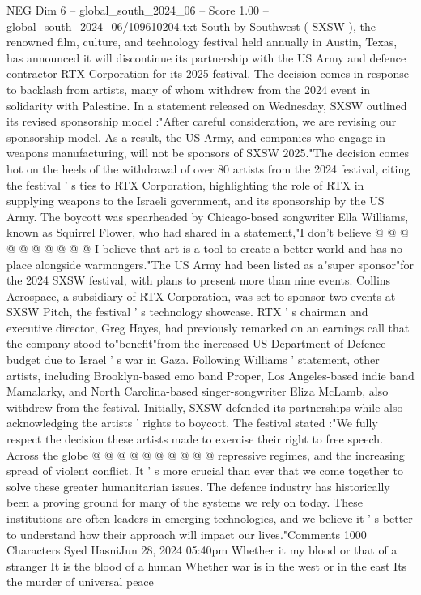 \begin{textsample}{NEG Dim 6 – global\_south\_2024\_06 – Score 1.00 – global\_south\_2024\_06/109610204.txt}  \label{ex:f6_neg_303}
South by Southwest ( SXSW ), the renowned film, culture, and technology festival held annually in Austin, Texas, has announced it will discontinue its partnership with the US Army and defence contractor RTX Corporation for its 2025 festival.
The decision comes in response to backlash from artists, many of whom withdrew from the 2024 event in solidarity with Palestine.
In a statement released on Wednesday, SXSW outlined its revised sponsorship model :"After careful consideration, we are revising our sponsorship model.
As a result, the US Army, and companies who engage in weapons manufacturing, will not be sponsors of SXSW 2025."The decision comes hot on the heels of the withdrawal of over 80 artists from the 2024 festival, citing the festival ' s ties to RTX Corporation, highlighting the role of RTX in supplying weapons to the Israeli government, and its sponsorship by the US Army.
The boycott was spearheaded by Chicago-based songwriter Ella Williams, known as Squirrel Flower, who had shared in a statement,"I don't believe @ @ @ @ @ @ @ @ @ @ I believe that art is a tool to create a better world and has no place alongside warmongers."The US Army had been listed as a"super sponsor"for the 2024 SXSW festival, with plans to present more than nine events.
Collins Aerospace, a subsidiary of RTX Corporation, was set to sponsor two events at SXSW Pitch, the festival ' s technology showcase.
RTX ' s chairman and executive director, Greg Hayes, had previously remarked on an earnings call that the company stood to"benefit"from the increased US Department of Defence budget due to Israel ' s war in Gaza.
Following Williams ' statement, other artists, including Brooklyn-based emo band Proper, Los Angeles-based indie band Mamalarky, and North Carolina-based singer-songwriter Eliza McLamb, also withdrew from the festival.
Initially, SXSW defended its partnerships while also acknowledging the artists ' rights to boycott.
The festival stated :"We fully respect the decision these artists made to exercise their right to free speech.
Across the globe @ @ @ @ @ @ @ @ @ @ repressive regimes, and the increasing spread of violent conflict.
It ' s more crucial than ever that we come together to solve these greater humanitarian issues.
The defence industry has historically been a proving ground for many of the systems we rely on today.
These institutions are often leaders in emerging technologies, and we believe it ' s better to understand how their approach will impact our lives."Comments 1000 Characters Syed HasniJun 28, 2024 05:40pm Whether it my blood or that of a stranger It is the blood of a human Whether war is in the west or in the east Its the murder of universal peace

\end{textsample}
